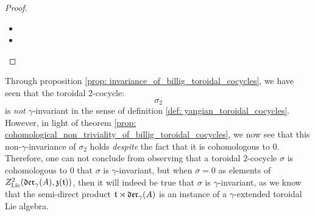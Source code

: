\begin{proof}
\begin{itemize}
$$\begin{aligned}
\begin{aligned}
                                    - & 2r \left( (-(s + 2)a + br) K_{-a - r, -b - s - 2} + \delta_{(a, b + 1), (-r, -s - 1)} \left( a c_v + b c_t \right) \right)
                                    \\
                                    - & ra \left( ( r(b + 1) - a(s + 1) )K_{-r - a, -s - b - 2} + \delta_{(a + r, b + s + 1), (0, -1)} (r c_v + (s + 1) c_t) \right)
                                \end{aligned}
                                \\
                                = &
                                \begin{aligned}
                                    & \left( 2(a - r) (sa - br) - ra ( as - br + a - r ) \right) K_{-a - r, -b - s - 2}
                                    \\
                                    + & \delta_{(a + r, b + s + 1), (0, -1)} \left( -r^2 a c_v + ( 2a(s + 1) + 2r(s + 2) - ra(s + 1) ) c_t \right)
                                \end{aligned}
                                \\
                                = &
                                \begin{aligned}
                                    & \left( 2(a - r) (sa - br) - ra ( as - br + a - r ) \right) K_{-a - r, -b - s - 2}
                                    \\
                                    + & \delta_{(a + r, b + s + 1), (0, -1)} \left( r^3 c_v + ( -2r + r^2(s + 1) ) c_t \right)
                                \end{aligned}
                            \end{aligned}
                        $$
                    \item 
                    \item 
                \end{itemize}
            \end{proof}
        \begin{remark}
            Through proposition \ref{prop: invariance_of_billig_toroidal_cocycles}, we have seen that the toroidal $2$-cocycle:
                $$\sigma_2$$
            is \textit{not} $\gamma$-invariant in the sense of definition \ref{def: yangian_toroidal_cocycles}. However, in light of theorem \ref{prop: cohomological_non_triviality_of_billig_toroidal_cocycles}, we now see that this non-$\gamma$-invariance of $\sigma_2$ holds \textit{despite} the fact that it is cohomologous to $0$. Therefore, one can not conclude from observing that a toroidal $2$-cocycle $\sigma$ is cohomologous to $0$ that $\sigma$ is $\gamma$-invariant, but when $\sigma = 0$ as elements of $Z^2_{\mathrm{Lie}}(\mathfrak{der}_{\gamma}(A), \mathfrak{z}(\mathfrak{t}))$, then it will indeed be true that $\sigma$ is $\gamma$-invariant, as we know that the semi-direct product $\mathfrak{t} \rtimes \mathfrak{der}_{\gamma}(A)$ is an instance of a $\gamma$-extended toroidal Lie algebra.
        \end{remark}